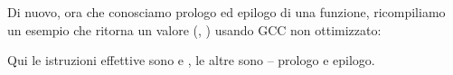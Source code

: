 
Di nuovo, ora che conosciamo prologo ed epilogo di una funzione, ricompiliamo un esempio che ritorna un valore
(, ) usando GCC non ottimizzato:



Qui le istruzioni effettive sono  e , le altre sono -- prologo e epilogo.

